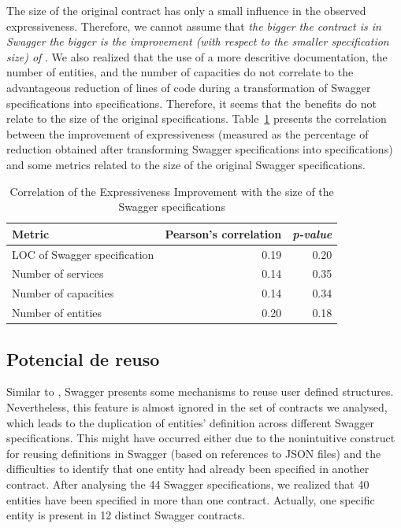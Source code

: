 The size of the original contract has only a small influence in the observed expressiveness. 
Therefore, we cannot assume that \emph{the bigger the contract is in Swagger 
the bigger is the improvement (with respect to the smaller specification size) of \neoidl}. We 
also realized that the use of a more descritive documentation, the number of entities, and the number of capacities do not correlate to the advantageous reduction of lines of code during a 
transformation of Swagger specifications into \neoidl{} specifications. Therefore, it seems that 
the benefits do not relate to the size of the original specifications.  
Table~\ref{tab:size-corr} presents the correlation between the improvement of 
expressiveness (measured as the percentage of reduction obtained 
after transforming Swagger specifications into \neoidl{} specifications) and 
some metrics related to the size of the original Swagger specifications.

\begin{table}[htb]
\caption{Correlation of the Expressiveness Improvement with the size of the Swagger specifications}
\begin{center}
\begin{tabular}{lrr} 
\toprule
Metric & Pearson's correlation & \emph{p-value} \\ \hline \hline 
LOC of Swagger specification & 0.19 &  0.20 \\ 
Number of services & 0.14 & 0.35 \\ 
Number of capacities & 0.14 & 0.34 \\
Number of entities & 0.20 & 0.18 \\ \bottomrule 
\end{tabular} 
\end{center}
\label{tab:size-corr}
\end{table}





\subsection{Potencial de reuso}



Similar to \neoidl{}, Swagger presents 
some mechanisms to reuse user defined structures. Nevertheless, 
this feature is almost ignored in the set of contracts we analysed, which 
leads to the duplication of entities' definition across different 
Swagger specifications. This might have occurred either due to the 
nonintuitive construct for reusing definitions in Swagger (based on 
references to JSON files) and the difficulties to identify 
that one entity had already been specified in another contract.
After analysing the 44 Swagger specifications, we realized that 40 entities 
have been specified in  more than one contract. Actually, one specific 
entity is present in 12 distinct Swagger contracts. 




